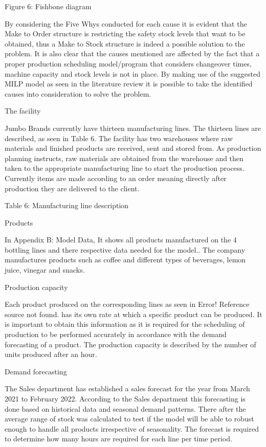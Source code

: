 \documentclass[a4paper,11pt,fleqn]{report}
\begin{document}
    Figure 6: Fishbone diagram
    
    By considering the Five Whys conducted for each cause it is evident that the Make to Order structure is restricting the safety stock levels that want to be obtained, thus a Make to Stock structure is indeed a possible solution to the problem. It is also clear that the causes mentioned are affected by the fact that a proper production scheduling model/program that considers changeover times, machine capacity and stock levels is not in place. By making use of the suggested MILP model as seen in the literature review it is possible to take the identified causes into consideration to solve the problem.
    
    The facility
    
    Jumbo Brands currently have thirteen manufacturing lines. The thirteen lines are described, as seen in Table 6. The facility has two warehouses where raw materials and finished products are received, sent and stored from. As production planning instructs, raw materials are obtained from the warehouse and then taken to the appropriate manufacturing line to start the production process. Currently items are made according to an order meaning directly after production they are delivered to the client.
    
    Table 6: Manufacturing line description
    
    Products
    
    In Appendix B: Model Data, It shows all products manufactured on the 4 bottling lines and there respective data needed for the model.. The company manufactures products such as coffee and different types of beverages, lemon juice, vinegar and snacks.
    
    Production capacity
    
    Each product produced on the corresponding lines as seen in Error! Reference source not found. has its own rate at which a specific product can be produced. It is important to obtain this information as it is required for the scheduling of production to be performed accurately in accordance with the demand forecasting of a product. The production capacity is described by the number of units produced after an hour.
    
    Demand forecasting
    
    The Sales department has established a sales forecast for the year from March 2021 to February 2022. According to the Sales department this forecasting is done based on historical data and seasonal demand patterns. There after the average range of stock was calculated to test if the model will be able to robust enough to handle all products irrespective of seasonality. The forecast is required to determine how many hours are required for each line per time period.
    
\end{document}
